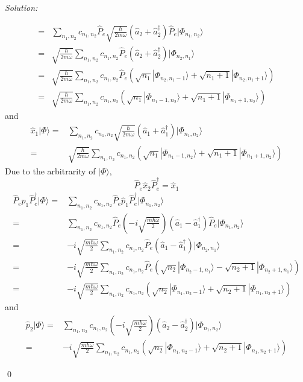 \documentclass[12pt,a4paper]{article}
\newenvironment{sol}
    {\emph{Solution:}
    }
    {
    \qed
    }
\begin{document}
\begin{sol}
\begin{itemize}
\begin{align}
\nonumber=&\sum_{n_1,n_2}c_{n_1,n_2}\hat{P}_e\sqrt{\frac{\hbar}{2m\omega}}(\hat{a}_2+\hat{a}_2^{\dagger})\hat{P}_e|\Phi_{n_1,n_2}\rangle\\
\nonumber=&\sqrt{\frac{\hbar}{2m\omega}}\sum_{n_1,n_2}c_{n_1,n_2}\hat{P}_e(\hat{a}_2+\hat{a}_2^{\dagger})|\Phi_{n_2,n_1}\rangle\\
\nonumber=&\sqrt{\frac{\hbar}{2m\omega}}\sum_{n_1,n_2}c_{n_1,n_2}\hat{P}_e(\sqrt{n_1}|\Phi_{n_2,n_1-1}\rangle+\sqrt{n_1+1}|\Phi_{n_2,n_1+1}\rangle)\\
=&\sqrt{\frac{\hbar}{2m\omega}}\sum_{n_1,n_2}c_{n_1,n_2}(\sqrt{n_1}|\Phi_{n_1-1,n_2}\rangle+\sqrt{n_1+1}|\Phi_{n_1+1,n_2}\rangle)
\end{align}
and
\begin{align}
\nonumber\hat{x}_1|\Phi\rangle=&\sum_{n_1,n_2}c_{n_1,n_2}\sqrt{\frac{\hbar}{2m\omega}}(\hat{a}_1+\hat{a}_1^{\dagger})|\Phi_{n_1,n_2}\rangle\\
=&\sqrt{\frac{\hbar}{2m\omega}}\sum_{n_1,n_2}c_{n_1,n_2}(\sqrt{n_1}|\Phi_{n_1-1,n_2}\rangle+\sqrt{n_1+1}|\Phi_{n_1+1,n_2}\rangle)
\end{align}
Due to the arbitrarity of $|\Phi\rangle$,
\begin{equation}
\hat{P}_e\hat{x}_2\hat{P}_e^{\dagger}=\hat{x}_1
\end{equation}
\begin{align}
\nonumber\hat{P}_e\hat{p}_1\hat{P}_e^{\dagger}|\Phi\rangle=&\sum_{n_1,n_2}c_{n_1,n_2}\hat{P}_e\hat{p}_1\hat{P}_e^{\dagger}|\Phi_{n_1,n_2}\rangle\\
\nonumber=&\sum_{n_1,n_2}c_{n_1,n_2}\hat{P}_e(-i\sqrt{\frac{m\hbar\omega}{2}})(\hat{a}_1-\hat{a}_1^{\dagger})\hat{P}_e|\Phi_{n_1,n_2}\rangle\\
\nonumber=&-i\sqrt{\frac{m\hbar\omega}{2}}\sum_{n_1,n_2}c_{n_1,n_2}\hat{P}_e(\hat{a}_1-\hat{a}_1^{\dagger})|\Phi_{n_2,n_1}\rangle\\
\nonumber=&-i\sqrt{\frac{m\hbar\omega}{2}}\sum_{n_1,n_2}c_{n_1,n_2}\hat{P}_e(\sqrt{n_2}|\Phi_{n_2-1,n_1}\rangle-\sqrt{n_2+1}|\Phi_{n_2+1,n_1}\rangle)\\
=&-i\sqrt{\frac{m\hbar\omega}{2}}\sum_{n_1,n_2}c_{n_1,n_2}(\sqrt{n_2}|\Phi_{n_1,n_2-1}\rangle+\sqrt{n_2+1}|\Phi_{n_1,n_2+1}\rangle)
\end{align}
and
\begin{align}
\nonumber\hat{p}_2|\Phi\rangle=&\sum_{n_1,n_2}c_{n_1,n_2}(-i\sqrt{\frac{m\hbar\omega}{2}})(\hat{a}_2-\hat{a}_2^{\dagger})|\Phi_{n_1,n_2}\rangle\\
=&-i\sqrt{\frac{m\hbar\omega}{2}}\sum_{n_1,n_2}c_{n_1,n_2}(\sqrt{n_2}|\Phi_{n_1,n_2-1}\rangle+\sqrt{n_2+1}|\Phi_{n_1,n_2+1}\rangle)

\end{align}
\end{itemize}
\end{sol}
\end{document}
